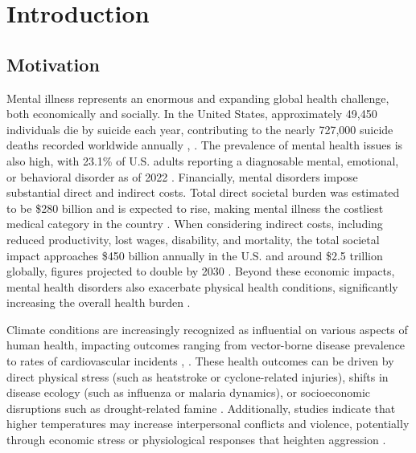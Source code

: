 \documentclass[12pt, a4paper]{article}
\begin{document}
\vspace{0.0in}

\thispagestyle{empty}\setcounter{page}{1}
\section{Introduction}
\subsection{Motivation}
Mental illness represents an enormous and expanding global health challenge, both economically and socially. In the United States, approximately 49,450 individuals die by suicide each year, contributing to the nearly 727,000 suicide deaths recorded worldwide annually \cite{usSuicideStat}, \cite{whoSuicideStat}. The prevalence of mental health issues is also high, with 23.1\% of U.S. adults reporting a diagnosable mental, emotional, or behavioral disorder as of 2022 \cite{usMentalStat}. Financially, mental disorders impose substantial direct and indirect costs. Total direct societal burden was estimated to be \$280 billion and is expected to rise, making mental illness the costliest medical category in the country \cite{MHCost}. When considering indirect costs, including reduced productivity, lost wages, disability, and mortality, the total societal impact approaches \$450 billion annually in the U.S. and around \$2.5 trillion globally, figures projected to double by 2030 \cite{futureMHCost}. Beyond these economic impacts, mental health disorders also exacerbate physical health conditions, significantly increasing the overall health burden \cite{noHealthwoMH}.

Climate conditions are increasingly recognized as influential on various aspects of human health, impacting outcomes ranging from vector-borne disease prevalence to rates of cardiovascular incidents \cite{Patz2014}, \cite{Watts2015}. These health outcomes can be driven by direct physical stress (such as heatstroke or cyclone-related injuries), shifts in disease ecology (such as influenza or malaria dynamics), or socioeconomic disruptions such as drought-related famine \cite{Watts2015}. Additionally, studies indicate that higher temperatures may increase interpersonal conflicts and violence, potentially through economic stress or physiological responses that heighten aggression \cite{Hsiang2013}.
\end{document}
